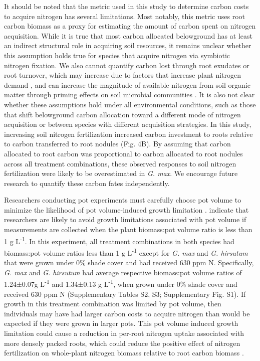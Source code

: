 It should be noted that the metric used in this study to determine carbon costs to acquire nitrogen has several limitations. Most notably, this metric uses root carbon biomass as a proxy for estimating the amount of carbon spent on nitrogen acquisition. While it is true that most carbon allocated belowground has at least an indirect structural role in acquiring soil resources, it remains unclear whether this assumption holds true for species that acquire nitrogen via symbiotic nitrogen fixation. We also cannot quantify carbon lost through root exudates or root turnover, which may increase due to factors that increase plant nitrogen demand , and can increase the magnitude of available nitrogen from soil organic matter through priming effects on soil microbial communities . It is also not clear whether these assumptions hold under all environmental conditions, such as those that shift belowground carbon allocation toward a different mode of nitrogen acquisition  or between species with different acquisition strategies. In this study, increasing soil nitrogen fertilization increased carbon investment to roots relative to carbon transferred to root nodules (Fig. 4B). By assuming that carbon allocated to root carbon was proportional to carbon allocated to root nodules across all treatment combinations, these observed responses to soil nitrogen fertilization were likely to be overestimated in \textit{G. max}. We encourage future research to quantify these carbon fates independently.

Researchers conducting pot experiments must carefully choose pot volume to minimize the likelihood of pot volume-induced growth limitation .  indicate that researchers are likely to avoid growth limitations associated with pot volume if measurements are collected when the plant biomass:pot volume ratio is less than 1 g L\textsuperscript{-1}. In this experiment, all treatment combinations in both species had biomass:pot volume ratios less than 1 g L\textsuperscript{-1} except for \textit{G. max} and \textit{G. hirsutum} that were grown under 0\% shade cover and had received 630 ppm N. Specifically, \textit{G. max} and \textit{G. hirsutum} had average respective biomass:pot volume ratios of 1.24±0.07g L\textsuperscript{-1} and 1.34±0.13 g L\textsuperscript{-1}, when grown under 0\% shade cover and received 630 ppm N (Supplementary Tables S2, S3; Supplementary Fig. S1). If growth in this treatment combination was limited by pot volume, then individuals may have had larger carbon costs to acquire nitrogen than would be expected if they were grown in larger pots. This pot volume induced growth limitation could cause a reduction in per-root nitrogen uptake associated with more densely packed roots, which could reduce the positive effect of nitrogen fertilization on whole-plant nitrogen biomass relative to root carbon biomass .

